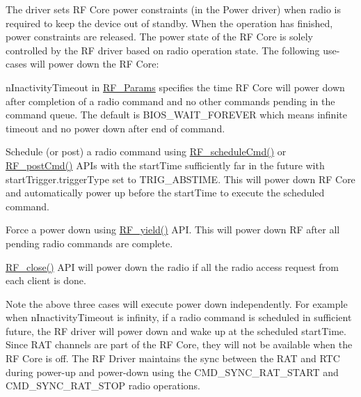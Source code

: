 The driver sets R\+F Core power constraints (in the Power driver) when radio is required to keep the device out of standby. When the operation has finished, power constraints are released. The power state of the R\+F Core is solely controlled by the R\+F driver based on radio operation state. The following use-\/cases will power down the R\+F Core\+:


\begin{DoxyEnumerate}
\item n\+Inactivity\+Timeout in \hyperlink{struct_r_f___params}{R\+F\+\_\+\+Params} specifies the time R\+F Core will power down after completion of a radio command and no other commands pending in the command queue. The default is B\+I\+O\+S\+\_\+\+W\+A\+I\+T\+\_\+\+F\+O\+R\+E\+V\+E\+R which means infinite timeout and no power down after end of command. ~\newline

\item Schedule (or post) a radio command using \hyperlink{_r_f_8h_a5e7f25943b5f3942bf4c09cb87f9aa76}{R\+F\+\_\+schedule\+Cmd()} or \hyperlink{_r_f_8h_a2b0ee444fcb74917df94eefea804ecbb}{R\+F\+\_\+post\+Cmd()} A\+P\+Is with the start\+Time sufficiently far in the future with start\+Trigger.\+trigger\+Type set to T\+R\+I\+G\+\_\+\+A\+B\+S\+T\+I\+M\+E. This will power down R\+F Core and automatically power up before the start\+Time to execute the scheduled command. ~\newline

\item Force a power down using \hyperlink{_r_f_8h_a299ada7963c727a40466d7d1bb7296a3}{R\+F\+\_\+yield()} A\+P\+I. This will power down R\+F after all pending radio commands are complete. ~\newline

\item \hyperlink{_r_f_8h_a9ff7e64561f7aa5526837521bceb5f88}{R\+F\+\_\+close()} A\+P\+I will power down the radio if all the radio access request from each client is done. ~\newline

\end{DoxyEnumerate}

Note the above three cases will execute power down independently. For example when n\+Inactivity\+Timeout is infinity, if a radio command is scheduled in sufficient future, the R\+F driver will power down and wake up at the scheduled start\+Time. Since R\+A\+T channels are part of the R\+F Core, they will not be available when the R\+F Core is off. The R\+F Driver maintains the sync between the R\+A\+T and R\+T\+C during power-\/up and power-\/down using the C\+M\+D\+\_\+\+S\+Y\+N\+C\+\_\+\+R\+A\+T\+\_\+\+S\+T\+A\+R\+T and C\+M\+D\+\_\+\+S\+Y\+N\+C\+\_\+\+R\+A\+T\+\_\+\+S\+T\+O\+P radio operations.

